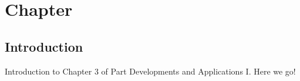 \chapter{Chapter}
\label{sect::devs01_chapter3}

\section{Introduction}
\label{sect::devs01_chapter3_intro}

Introduction to Chapter 3 of Part Developments and Applications I. Here we go!